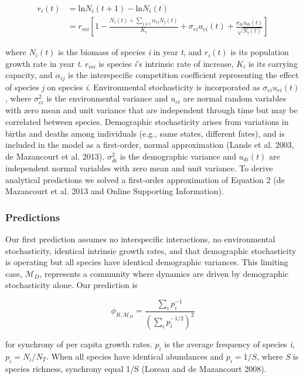 \documentclass[12pt,]{article}
\begin{document}
\begin{align}
r_i(t) &= \text{ln}N_i(t+1) - \text{ln}N_i(t) \\
&= r_{mi} \left[ 1- \frac{N_i(t)+\sum_{j \neq i} \alpha_{ij}N_j(t)} {K_i} + \sigma_{ei}u_{ei}(t) + \frac{\sigma_{di}u_{di}(t)}{\sqrt{N_i(t)}} \right]
\end{align}

\noindent where \(N_i(t)\) is the biomass of species \emph{i} in year
\emph{t}, and \(r_i(t)\) is its population growth rate in year \emph{t}.
\(r_{mi}\) is species \emph{i}'s intrinsic rate of increase, \(K_i\) is
its carrying capacity, and \(\alpha_{ij}\) is the interspecific
competition coefficient representing the effect of species \emph{j} on
species \emph{i}. Environmental stochasticity is incorporated as
\(\sigma_{ei}u_{ei}(t)\), where \(\sigma_{ei}^2\) is the environmental
variance and \(u_{ei}\) are normal random variables with zero mean and
unit variance that are independent through time but may be correlated
between species. Demographic stochasticity arises from variations in
births and deaths among individuals (e.g., same states, different
fates), and is included in the model as a first-order, normal
approximation (Lande et al. 2003, {{de Mazancourt}} et al. 2013).
\(\sigma_{di}^2\) is the demographic variance and \(u_{di}(t)\) are
independent normal variables with zero mean and unit variance. To derive
analytical predictions we solved a first-order approximation of Equation
2 ({{de Mazancourt}} et al. 2013 and Online Supporting Information).

\subsubsection{Predictions}\label{predictions}

Our first prediction assumes no interspecific interactions, no
environmental stochasticity, identical intrinsic growth rates, and that
demographic stochasticity is operating but all species have identical
demographic variances. This limiting case, \(\mathcal{M}_{D}\),
represents a community where dynamics are driven by demographic
stochasticity alone. Our prediction is

\begin{equation}
\phi_{R,\mathcal{M}_{D}} = \frac{\sum_i p_i^{-1}}{\left(\sum_i p_i^{-1/2} \right)^2}
\end{equation}

\noindent for synchrony of per capita growth rates. \(p_i\) is the
average frequency of species \emph{i}, \(p_i = N_i/N_T\). When all
species have identical abundances and \(p_i = 1/S\), where \emph{S} is
species richness, synchrony equal 1/S (Loreau and {{de Mazancourt}}
2008).
\end{document}
